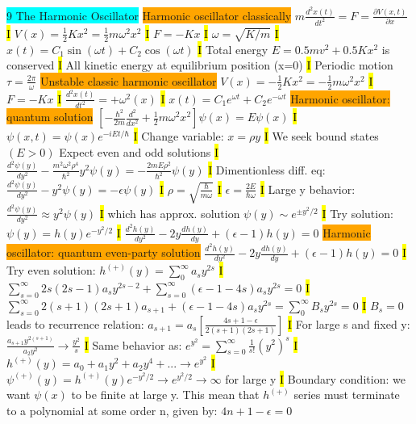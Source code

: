 \documentclass[fontsize=4pt]{scrartcl}
\begin{document}
\colorbox{Cyan}{9 The Harmonic Oscillator}
\colorbox{Orange}{Harmonic oscillator classically}
$m\frac{d^2x(t)}{dt^2}=F=\frac{\partial V(x,t)}{\partial x}$
\hl{I}
$V(x) = \frac{1}{2}Kx^2 = \frac{1}{2}m\omega^2x^2$
\hl{I}
$F=-Kx$
\hl{I}
$\omega = \sqrt{K/m}$
\hl{I}
$x(t) = C_1 \sin(\omega t) + C_2 \cos (\omega t)$
\hl{I}
Total energy $E = 0.5 mv^2 + 0.5Kx^2$ is conserved
\hl{I} 
All kinetic energy at equilibrium position (x=0)
\hl{I}
Periodic motion $\tau = \frac{2\pi}{\omega}$
\colorbox{Orange}{Unstable classic harmonic oscillator}
$V(x) = -\frac{1}{2}Kx^2 = -\frac{1}{2}m\omega^2x^2$
\hl{I}
$F=-Kx$
\hl{I}
$\frac{d^2 x(t)}{dt^2} = +\omega^2 (x)$
\hl{I}
$x(t) = C_1 e^{\omega t} + C_2 e^{-\omega t}$
\colorbox{Orange}{Harmonic oscillator: quantum solution}
$[-\frac{\hbar^2}{2m}\frac{d^2}{dx^2}+\frac{1}{2}m\omega^2 x^2] \psi(x) = E\psi(x)$
\hl{I}
$\psi(x,t) = \psi(x)e^{-iEt/\hbar}$
\hl{I}
Change variable: $x=\rho y$
\hl{I}
We seek bound states $(E > 0)$ Expect even and odd solutions
\hl{I}
$\frac{d^2\psi(y)}{dy^2} - \frac{m^2 \omega^2 \rho^4}{\hbar^2} y^2 \psi(y) = -\frac{2mE\rho^2}{\hbar^2}\psi(y)$ 
\hl{I}
Dimentionless diff. eq: $\frac{d^2 \psi(y)}{dy^2} - y^2 \psi(y) = -\epsilon \psi(y)$
\hl{I}
$\rho = \sqrt{\frac{\hbar}{m\omega}}$
\hl{I}
$\epsilon = \frac{2E}{\hbar \omega}$
\hl{I}
Large y behavior: $\frac{d^2 \psi(y)}{dy^2} \approx y^2 \psi(y)$
\hl{I}
which has approx. solution $\psi(y) \sim e^{\pm y^2/2}$
\hl{I}
Try solution: $\psi(y) = h(y)e^{-y^2 /2}$
\hl{I}
$\frac{d^2 h(y)}{dy^2} -2y\frac{dh(y)}{dy} + (\epsilon - 1)h(y) = 0$
\colorbox{Orange}{Harmonic oscillator: quantum even-party solution}
$\frac{d^2 h(y)}{dy^2} -2y\frac{dh(y)}{dy} + (\epsilon - 1)h(y) = 0$
\hl{I}
Try even solution: $h^{(+)}(y) = \sum_0^{\infty} a_s y^{2s}$
\hl{I}
$\sum_{s=0}^{\infty} 2s(2s - 1)a_s y^{2s-2} + \sum_{s=0}^{\infty} (\epsilon -1 -4s)a_s y^{2s} = 0$
\hl{I}
$\sum_{s=0}^{\infty} 2(s+1)(2s + 1)a_{s+1} + (\epsilon -1 -4s)a_s y^{2s} = \sum_{0}^{\infty}B_s y^{2s} = 0$
\hl{I}
$B_s = 0$ leads to recurrence relation: $a_{s+1} = a_s[\frac{4s+1-\epsilon}{2(s+1)(2s+1)}]$
\hl{I}
For large s and fixed y: $\frac{a_{s+1}y^{2(s+1)}}{a_2 y^2} \rightarrow \frac{y^2}{s}$
\hl{I}
Same behavior as: $e^{y^2} = \sum_{s=0}^{\infty} \frac{1}{s!}(y^2)^s$
\hl{I}
$h^{(+)}(y) = a_0 + a_1 y^2 + a_2 y^4 + ... \rightarrow e^{y^2}$
\hl{I}
$\psi^{(+)}(y) = h^{(+)}(y)e^{-y^2 / 2} \rightarrow e^{y^2/2} \rightarrow \infty$ for large y
\hl{I}
Boundary condition: we want $\psi(x)$ to be finite at large y. This mean that $h^{(+)}$ series must terminate to a polynomial at some order n, given by: $4n + 1 - \epsilon = 0$
\end{document}
